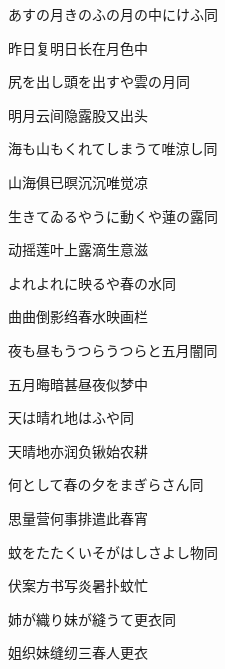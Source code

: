 \begin{haiku}
    {\FH あすの月きのふの月の中にけふ}\hfill{\FH 同}

    {\FK 昨日复明日长在月色中}
\end{haiku}

\begin{haiku}
    {\FH 尻を出し頭を出すや雲の月}\hfill{\FH 同}

    {\FK 明月云间隐露股又出头}
\end{haiku}

\begin{haiku}
    {\FH 海も山もくれてしまうて唯涼し}\hfill{\FH 同}

    {\FK 山海俱已暝沉沉唯觉凉}
\end{haiku}

\begin{haiku}
    {\FH 生きてゐるやうに動くや蓮の露}\hfill{\FH 同}

    {\FK 动摇莲叶上露滴生意滋}
\end{haiku}

\begin{haiku}
    {\FH よれよれに映るや春の水}\hfill{\FH 同}

    {\FK 曲曲倒影绉春水映画栏}
\end{haiku}

\begin{haiku}
    {\FH 夜も昼もうつらうつらと五月闇}\hfill{\FH 同}

    {\FK 五月晦暗甚昼夜似梦中}
\end{haiku}

\begin{haiku}
    {\FH 天は晴れ地はふや}\hfill{\FH 同}

    {\FK 天晴地亦润负锹始农耕}
\end{haiku}

\begin{haiku}
    {\FH 何として春の夕をまぎらさん}\hfill{\FH 同}

    {\FK 思量营何事排遣此春宵}
\end{haiku}

\begin{haiku}
    {\FH 蚊をたたくいそがはしさよし物}\hfill{\FH 同}

    {\FK 伏案方书写炎暑扑蚊忙}
\end{haiku}

\begin{haiku}
    {\FH 姉が織り妹が縫うて更衣}\hfill{\FH 同}

    {\FK 姐织妹缝纫三春人更衣}
\end{haiku}

